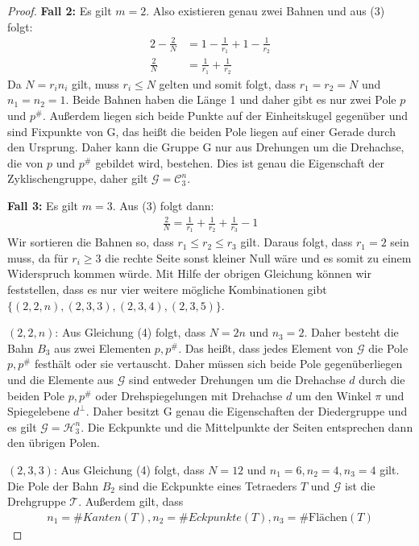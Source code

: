 \begin{proof}
\textbf{Fall 2:} Es gilt $m=2$. Also existieren genau zwei Bahnen und aus (3) folgt:
\begin{align*}
 2-\frac{2}{N} &= 1-\frac{1}{r_1} + 1-\frac{1}{r_2} \\
 \frac{2}{N} &= \frac{1}{r_1} + \frac{1}{r_2}
\end{align*}
Da $N=r_i n_i$ gilt, muss $r_i \leq N$ gelten und somit folgt, dass $r_1 = r_2 = N$ und $n_1 = n_2 = 1$. Beide Bahnen haben die Länge 1 und daher gibt es nur zwei Pole $p$ und $p^{\#}$. Außerdem liegen sich beide Punkte auf der Einheitskugel gegenüber und sind Fixpunkte von G, das heißt die beiden Pole liegen auf einer Gerade durch den Ursprung. Daher kann die Gruppe G nur aus Drehungen um die Drehachse, die von $p$ und $p^{\#}$ gebildet wird, bestehen. Dies ist genau die Eigenschaft der Zyklischengruppe, daher gilt $\mathcal{G}=\mathcal{C}_3^n$.

\textbf{Fall 3:} Es gilt $m=3$. Aus (3) folgt dann:
\begin{align}
 \frac{2}{N} = \frac{1}{r_1} + \frac{1}{r_2} + \frac{1}{r_3} - 1
\end{align}
Wir sortieren die Bahnen so, dass $r_1 \leq r_2 \leq r_3$ gilt. Daraus folgt, dass $r_1 = 2$ sein muss, da für $r_i \geq 3$ die rechte Seite sonst kleiner Null wäre und es somit zu einem Widerspruch kommen würde. Mit Hilfe der obrigen Gleichung können wir feststellen, dass es nur vier weitere mögliche Kombinationen gibt $\{(2,2,n),(2,3,3),(2,3,4),(2,3,5)\}$.


$(2,2,n)$: Aus Gleichung (4) folgt, dass $N = 2n$ und $n_3=2$. Daher besteht die Bahn $B_3$ aus zwei Elementen $p, p^{\#}$. Das heißt, dass jedes Element von $\mathcal{G}$ die Pole $p,p^{\#}$ festhält oder sie vertauscht. Daher müssen sich beide Pole gegenüberliegen und die Elemente aus $\mathcal{G}$ sind entweder Drehungen um die Drehachse $d$ durch die beiden Pole $p,p^{\#}$ oder Drehspiegelungen mit Drehachse $d$ um den Winkel $\pi$ und Spiegelebene $d^{\perp}$. Daher besitzt G genau die Eigenschaften der Diedergruppe und es gilt $\mathcal{G} = \mathcal{H}_3^n$. Die Eckpunkte und die Mittelpunkte der Seiten entsprechen dann den übrigen Polen. 


$(2,3,3)$: Aus Gleichung (4) folgt, dass $N = 12$ und $n_1 = 6, n_2 = 4, n_3 = 4$ gilt. Die Pole der Bahn $B_2$ sind die Eckpunkte eines Tetraeders $T$ und $\mathcal{G}$ ist die Drehgruppe $\mathcal{T}$. Außerdem gilt, dass
\begin{align*}
n_1 = \# Kanten(T),n_2 = \# Eckpunkte(T),n_3 = \# \text{Flächen}(T)
\end{align*}



\end{proof}
